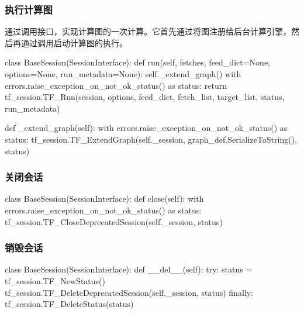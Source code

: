 \begin{content}
\subsubsection{执行计算图}

通过调用接口，实现计算图的一次计算。它首先通过将图注册给后台计算引擎，然后再通过调用启动计算图的执行。

\begin{leftbar}
\begin{python}
class BaseSession(SessionInterface):
  def run(self, 
    fetches, feed_dict=None, options=None, run_metadata=None):
    self._extend_graph()
    with errors.raise_exception_on_not_ok_status() as status:
      return tf_session.TF_Run(session, 
        options, feed_dict, fetch_list, 
        target_list, status, run_metadata)
  
  def _extend_graph(self):
    with errors.raise_exception_on_not_ok_status() as status:
      tf_session.TF_ExtendGraph(self._session,
        graph_def.SerializeToString(), status)  
\end{python}
\end{leftbar}

\subsubsection{关闭会话}

\begin{leftbar}
\begin{python}
class BaseSession(SessionInterface):
  def close(self):
    with errors.raise_exception_on_not_ok_status() as status:
      tf_session.TF_CloseDeprecatedSession(self._session, status)
\end{python}
\end{leftbar}

\subsubsection{销毁会话}

\begin{leftbar}
\begin{python}
class BaseSession(SessionInterface):
  def __del__(self):
    try:
      status = tf_session.TF_NewStatus()
      tf_session.TF_DeleteDeprecatedSession(self._session, status)
    finally:
      tf_session.TF_DeleteStatus(status)
\end{python}
\end{leftbar}

\end{content}
